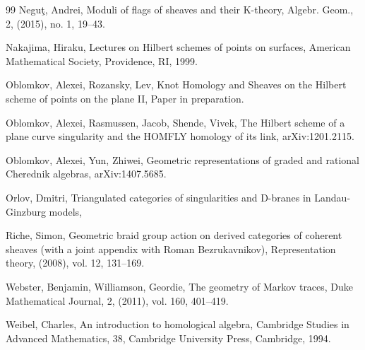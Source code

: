 \documentclass[10pt]{amsart}
\begin{document}
\begin{thebibliography}{99}
Negu{\c t}, Andrei,
Moduli of flags of sheaves and their K-theory,
Algebr. Geom.,
2,
(2015),
no. 1,
19--43.

Nakajima, Hiraku,
 Lectures on Hilbert schemes of points on surfaces,
 American Mathematical Society,
 Providence, RI,
1999.

Oblomkov, Alexei,
Rozansky, Lev,
Knot Homology and Sheaves on the Hilbert scheme of points on the plane II,
Paper in preparation.


Oblomkov, Alexei,
Rasmussen, Jacob,
Shende, Vivek,
The Hilbert scheme of a plane curve singularity and the HOMFLY homology of its link,
arXiv:1201.2115.


Oblomkov, Alexei,
Yun, Zhiwei,
Geometric representations of graded and rational Cherednik algebras,
arXiv:1407.5685.

 Orlov, Dmitri, Triangulated categories of singularities and D-branes in Landau-Ginzburg models,

Riche, Simon,
Geometric braid group action on derived categories of coherent sheaves (with a joint appendix with Roman Bezrukavnikov),
Representation theory,
(2008),
vol. 12,
131--169.


Webster, Benjamin,
Williamson, Geordie,
The geometry of Markov traces,
Duke Mathematical Journal,
2,
(2011),
vol. 160,
401--419.

 Weibel, Charles,
An introduction to homological algebra,
Cambridge Studies in Advanced Mathematics, 38,
Cambridge University Press,
Cambridge, 1994.

\end{thebibliography}
\end{document}
